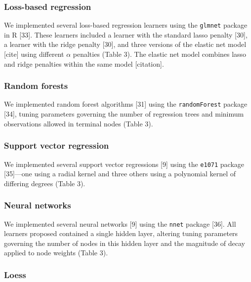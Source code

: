 \documentclass[10pt,letterpaper]{article}
\begin{document}
\hypertarget{loss-based-regression}{%
\subsubsection{Loss-based regression}\label{loss-based-regression}}

We implemented several loss-based regression learners using the
\texttt{glmnet} package in R {[}33{]}. These learners included a learner
with the standard lasso penalty {[}30{]}, a learner with the ridge
penalty {[}30{]}, and three versions of the elastic net model {[}cite{]}
using different \(\alpha\) penalties (Table 3). The elastic net model
combines lasso and ridge penalties within the same model {[}citation{]}.

\hypertarget{random-forests}{%
\subsubsection{Random forests}\label{random-forests}}

We implemented random forest algorithms {[}31{]} using the
\texttt{randomForest} package {[}34{]}, tuning parameters governing the
number of regression trees and minimum observations allowed in terminal
nodes (Table 3).

\hypertarget{support-vector-regression}{%
\subsubsection{Support vector
regression}\label{support-vector-regression}}

We implemented several support vector regressions {[}9{]} using the
\texttt{e1071} package {[}35{]}---one using a radial kernel and three
others using a polynomial kernel of differing degrees (Table 3).

\hypertarget{neural-networks}{%
\subsubsection{Neural networks}\label{neural-networks}}

We implemented several neural networks {[}9{]} using the \texttt{nnet}
package {[}36{]}. All learners proposed contained a single hidden layer,
altering tuning parameters governing the number of nodes in this hidden
layer and the magnitude of decay applied to node weights (Table 3).

\hypertarget{loess}{%
\subsubsection{Loess}\label{loess}}
\end{document}
